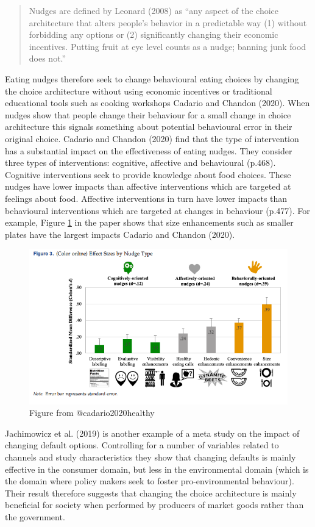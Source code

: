 \documentclass[
]{book}
\begin{document}
\begin{quote}
Nudges are defined by Leonard (2008) as ``any aspect of the choice architecture that alters people's behavior in a predictable way (1) without forbidding any options or (2) significantly changing their economic incentives. Putting fruit at eye level counts as a nudge; banning junk food does not.''
\end{quote}

Eating nudges therefore seek to change behavioural eating choices by changing the choice architecture without using economic incentives or traditional educational tools such as cooking workshops Cadario and Chandon (2020). When nudges show that people change their behaviour for a small change in choice architecture this signals something about potential behavioural error in their original choice. Cadario and Chandon (2020) find that the type of intervention has a substantial impact on the effectiveness of eating nudges. They consider three types of interventions: cognitive, affective and behavioural (p.468). Cognitive interventions seek to provide knowledge about food choices. These nudges have lower impacts than affective interventions which are targeted at feelings about food. Affective interventions in turn have lower impacts than behavioural interventions which are targeted at changes in behaviour (p.477). For example, Figure \ref{fig:cadario} in the paper shows that size enhancements such as smaller plates have the largest impacts Cadario and Chandon (2020).

\begin{figure}
\includegraphics[width=9.58in]{./figures/cadario} \caption{Figure from @cadario2020healthy}\label{fig:cadario}
\end{figure}

Jachimowicz et al. (2019) is another example of a meta study on the impact of changing default options. Controlling for a number of variables related to channels and study characteristics they show that changing defaults is mainly effective in the consumer domain, but less in the environmental domain (which is the domain where policy makers seek to foster pro-environmental behaviour). Their result therefore suggests that changing the choice architecture is mainly beneficial for society when performed by producers of market goods rather than the government.
\end{document}
